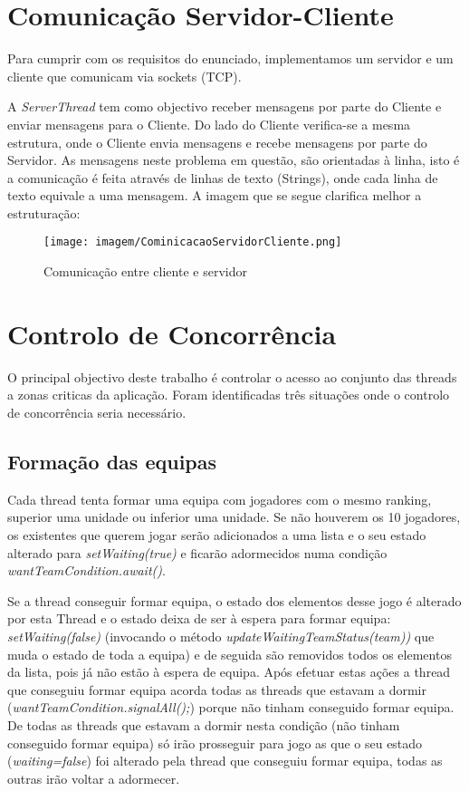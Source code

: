 \chapter{Comunicação Servidor-Cliente}
Para cumprir com os requisitos do enunciado, implementamos um servidor e
um cliente que comunicam via sockets (TCP). 

 A \textit{ServerThread} tem como objectivo receber mensagens por parte do Cliente e  enviar mensagens para o Cliente. Do lado do Cliente verifica-se a mesma estrutura, onde o Cliente envia mensagens e recebe mensagens por parte do Servidor. As mensagens neste problema em questão, são orientadas à linha, isto é a comunicação é feita através de linhas de texto (Strings), onde cada linha de texto equivale a uma mensagem. A imagem que se segue clarifica melhor a estruturação: 
 
\begin{figure}[tbph]
	\centering
	\texttt{[image: imagem/CominicacaoServidorCliente.png]}
	\caption{Comunicação entre cliente e servidor}
	\label{fig:cominicacaoservidorcliente}
\end{figure}
 

\chapter{Controlo de Concorrência}
O principal objectivo deste trabalho é controlar o acesso ao conjunto das threads a zonas criticas da aplicação. Foram identificadas três situações onde o controlo de concorrência seria necessário. 

\section{Formação das equipas}

Cada thread tenta formar uma equipa com jogadores com o mesmo ranking, superior uma unidade ou inferior uma unidade. Se não houverem os 10 jogadores, os existentes que querem jogar serão adicionados a uma lista e o seu estado alterado para \textit{setWaiting(true)}  e ficarão adormecidos numa condição \textit{wantTeamCondition.await()}. 

Se a thread conseguir formar equipa, o estado dos elementos desse jogo é alterado por esta Thread e o estado deixa de ser à espera para formar equipa: \textit{setWaiting(false)} (invocando o método \textit{updateWaitingTeamStatus(team))} que muda o estado de toda a equipa) e de seguida são removidos todos os elementos da lista, pois já não estão à espera de equipa. Após efetuar estas ações a thread que conseguiu formar equipa acorda todas as threads que estavam a dormir (\textit{wantTeamCondition.signalAll();}) porque não tinham conseguido formar equipa. De todas as threads que estavam a dormir nesta condição (não tinham conseguido formar equipa) só irão prosseguir para jogo as que o seu estado (\textit{waiting=false}) foi alterado pela thread que conseguiu formar equipa, todas as outras irão voltar a adormecer.  


